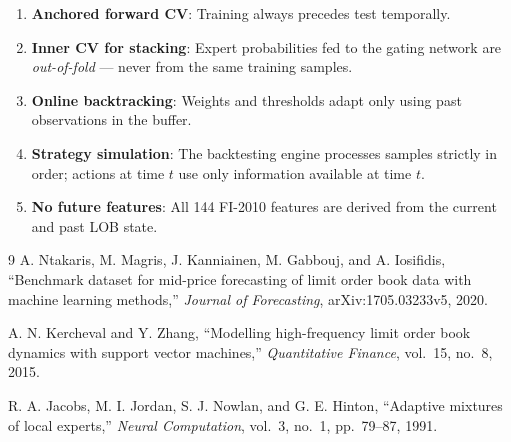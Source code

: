 \documentclass[12pt, a4paper]{article}
\begin{document}
\begin{enumerate}
  \item \textbf{Anchored forward CV}: Training always precedes test temporally.
  \item \textbf{Inner CV for stacking}: Expert probabilities fed to the gating network are \textit{out-of-fold} — never from the same training samples.
  \item \textbf{Online backtracking}: Weights and thresholds adapt only using past observations in the buffer.
  \item \textbf{Strategy simulation}: The backtesting engine processes samples strictly in order; actions at time $t$ use only information available at time $t$.
  \item \textbf{No future features}: All 144 FI-2010 features are derived from the current and past LOB state.
\end{enumerate}

\begin{thebibliography}{9}
A. Ntakaris, M. Magris, J. Kanniainen, M. Gabbouj, and A. Iosifidis,
``Benchmark dataset for mid-price forecasting of limit order book data with machine learning methods,''
\textit{Journal of Forecasting}, arXiv:1705.03233v5, 2020.

A. N. Kercheval and Y. Zhang,
``Modelling high-frequency limit order book dynamics with support vector machines,''
\textit{Quantitative Finance}, vol.~15, no.~8, 2015.

R. A. Jacobs, M. I. Jordan, S. J. Nowlan, and G. E. Hinton,
``Adaptive mixtures of local experts,''
\textit{Neural Computation}, vol.~3, no.~1, pp.~79--87, 1991.
\end{thebibliography}
\end{document}
